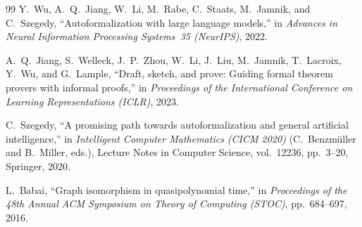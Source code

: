 \documentclass[11pt]{article}
\theoremstyle{definition}
\theoremstyle{remark}
\begin{document}
\begin{thebibliography}{99}
Y.~Wu, A.~Q.~Jiang, W.~Li, M.~Rabe, C.~Staats, M.~Jamnik,
and C.~Szegedy,
``Autoformalization with large language models,''
in \emph{Advances in Neural Information Processing Systems~35
(NeurIPS)}, 2022.

A.~Q.~Jiang, S.~Welleck, J.~P.~Zhou, W.~Li, J.~Liu,
M.~Jamnik, T.~Lacroix, Y.~Wu, and G.~Lample,
``Draft, sketch, and prove: Guiding formal theorem provers with
informal proofs,''
in \emph{Proceedings of the International Conference on Learning
Representations (ICLR)}, 2023.

C.~Szegedy,
``A promising path towards autoformalization and general artificial
intelligence,''
in \emph{Intelligent Computer Mathematics (CICM 2020)}
(C.~Benzm\"uller and B.~Miller, eds.),
Lecture Notes in Computer Science, vol.~12236, pp.~3--20,
Springer, 2020.

L.~Babai,
``Graph isomorphism in quasipolynomial time,''
in \emph{Proceedings of the 48th Annual ACM Symposium on Theory
of Computing (STOC)}, pp.~684--697, 2016.

\end{thebibliography}
\end{document}
